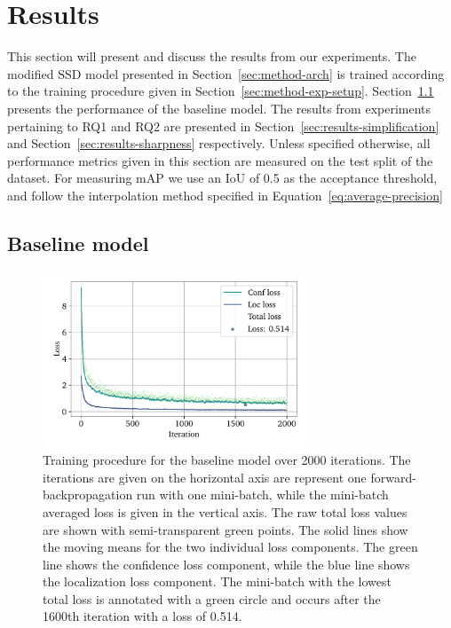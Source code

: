 \chapter{Results}\label{cha:results}

This section will present and discuss the results from our experiments.
The modified SSD model presented in Section~\ref{sec:method-arch} is trained according to the training procedure given in Section~\ref{sec:method-exp-setup}.
Section~\ref{sec:results-baseline} presents the performance of the baseline model. 
The results from experiments pertaining to RQ1 and RQ2 are presented in Section~\ref{sec:results-simplification} and Section~\ref{sec:results-sharpness} respectively.
Unless specified otherwise, all performance metrics given in this section are measured on the test split of the dataset. For measuring mAP we use an IoU of 0.5 as the acceptance threshold, and follow the interpolation method specified in Equation~\ref{eq:average-precision}

\section{Baseline model}\label{sec:results-baseline}
\begin{figure}[htb]
    \centering
    \includegraphics[width=0.7\textwidth]{figs/method/baseline/loss2.pdf}
    \caption[Baseline training procedure]{%
Training procedure for the baseline model over 2000 iterations.
The iterations are given on the horizontal axis are represent one forward-backpropagation run with one mini-batch, while the mini-batch averaged loss is given in the vertical axis.
The raw total loss values are shown with semi-transparent green points.
The solid lines show the moving means for the two individual loss components.
The green line shows the confidence loss component, while the blue line shows the localization loss component.
The mini-batch with the lowest total loss is annotated with a green circle and occurs after the 1600th iteration with a loss of 0.514.
    }\label{fig:method-baseline-loss}
  \end{figure}

